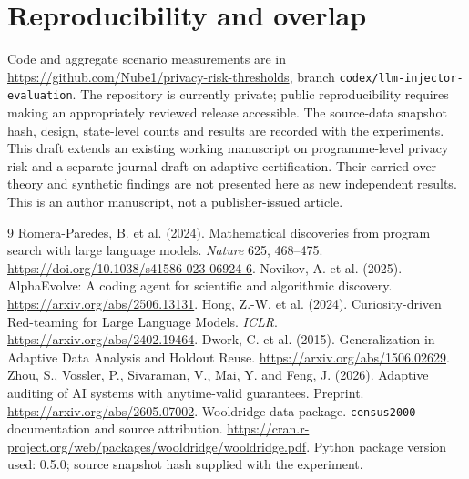 \documentclass[11pt]{article}
\begin{document}
\section*{Reproducibility and overlap}
Code and aggregate scenario measurements are in \url{https://github.com/Nube1/privacy-risk-thresholds}, branch \texttt{codex/llm-injector-evaluation}. The repository is currently private; public reproducibility requires making an appropriately reviewed release accessible. The source-data snapshot hash, design, state-level counts and results are recorded with the experiments. This draft extends an existing working manuscript on programme-level privacy risk and a separate journal draft on adaptive certification. Their carried-over theory and synthetic findings are not presented here as new independent results. This is an author manuscript, not a publisher-issued article.

\begin{thebibliography}{9}
 Romera-Paredes, B. et al. (2024). Mathematical discoveries from program search with large language models. \emph{Nature} 625, 468--475. \url{https://doi.org/10.1038/s41586-023-06924-6}.
 Novikov, A. et al. (2025). AlphaEvolve: A coding agent for scientific and algorithmic discovery. \url{https://arxiv.org/abs/2506.13131}.
 Hong, Z.-W. et al. (2024). Curiosity-driven Red-teaming for Large Language Models. \emph{ICLR}. \url{https://arxiv.org/abs/2402.19464}.
 Dwork, C. et al. (2015). Generalization in Adaptive Data Analysis and Holdout Reuse. \url{https://arxiv.org/abs/1506.02629}.
 Zhou, S., Vossler, P., Sivaraman, V., Mai, Y. and Feng, J. (2026). Adaptive auditing of AI systems with anytime-valid guarantees. Preprint. \url{https://arxiv.org/abs/2605.07002}.
 Wooldridge data package. \texttt{census2000} documentation and source attribution. \url{https://cran.r-project.org/web/packages/wooldridge/wooldridge.pdf}. Python package version used: 0.5.0; source snapshot hash supplied with the experiment.
\end{thebibliography}
\end{document}

